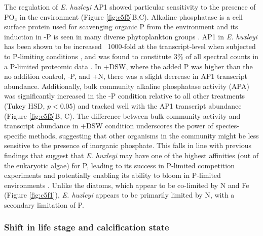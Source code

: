 The regulation of \textit{E. huxleyi} AP1 showed particular sensitivity to the presence of PO$_4$ in the environment (Figure \ref{fig:c5f5}B,C). Alkaline phosphatase is a cell surface protein used for scavenging organic P from the environment and its induction in -P is seen in many diverse phytoplankton groups \citep{Sakshaug1984, Dyhrman1997, Dyhrman2003, Wurch2011}. AP1 in \textit{E. huxleyi} has been shown to be increased ~1000-fold at the transcript-level when subjected to P-limiting conditions \citep{Xu2006}, and was found to constitute 3\% of all spectral counts in a P-limited proteomic data \citep{McKew2015}. In +DSW, where the added P was higher than the no addition control, -P, and +N, there was a slight decrease in AP1 transcript abundance. Additionally, bulk community alkaline phosphatase activity (APA) was significantly increased in the -P condition relative to all other treatments (Tukey HSD, $p < 0.05$) and tracked well with the AP1 transcript abundance (Figure \ref{fig:c5f5}B, C). The difference between bulk community activity and transcript abundance in +DSW condition underscores the power of species-specific methods, suggesting that other organisms in the community might be less sensitive to the presence of inorganic phosphate. This falls in line with previous findings that suggest that \textit{E. huxleyi} may have one of the highest affinities (out of the eukaryotic algae) for P, leading to its success in P-limited competition experiments \citep{Riegman2000} and potentially enabling its ability to bloom in P-limited environments \citep{Lessard2005}. Unlike the diatoms, which appear to be co-limited by N and Fe (Figure \ref{fig:c5f1}), \textit{E. huxleyi} appears to be primarily limited by N, with a secondary limitation of P. \par


\subsubsection{Shift in life stage and calcification state}

